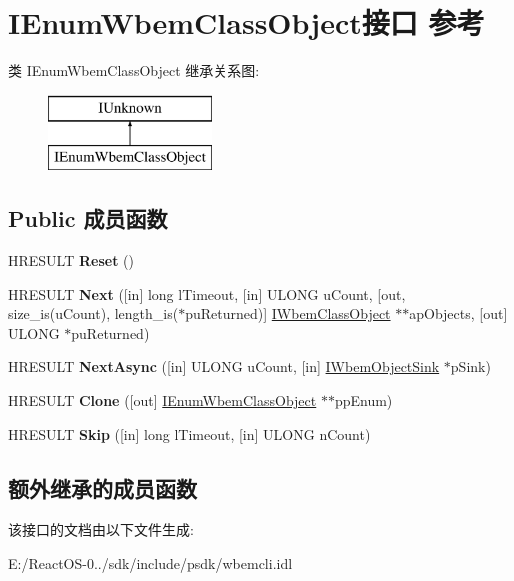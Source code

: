 \hypertarget{interface_i_enum_wbem_class_object}{}\section{I\+Enum\+Wbem\+Class\+Object接口 参考}
\label{interface_i_enum_wbem_class_object}
类 I\+Enum\+Wbem\+Class\+Object 继承关系图\+:\begin{figure}[H]
\begin{center}
\leavevmode
\includegraphics[height=2.000000cm]{interface_i_enum_wbem_class_object}
\end{center}
\end{figure}
\subsection*{Public 成员函数}
\begin{DoxyCompactItemize}
\item 
\mbox{\label{interface_i_enum_wbem_class_object_a07b5b424fe76a86534e214233ad41e21}} 
H\+R\+E\+S\+U\+LT {\bfseries Reset} ()
\item 
\mbox{\label{interface_i_enum_wbem_class_object_a146b51addd231b115fd0f9b2d6c6fa98}} 
H\+R\+E\+S\+U\+LT {\bfseries Next} (\mbox{[}in\mbox{]} long l\+Timeout, \mbox{[}in\mbox{]} U\+L\+O\+NG u\+Count, \mbox{[}out, size\+\_\+is(u\+Count), length\+\_\+is($\ast$pu\+Returned)\mbox{]} \hyperlink{interface_i_wbem_class_object}{I\+Wbem\+Class\+Object} $\ast$$\ast$ap\+Objects, \mbox{[}out\mbox{]} U\+L\+O\+NG $\ast$pu\+Returned)
\item 
\mbox{\label{interface_i_enum_wbem_class_object_a4f1ead1f8b7188451dbd199c3e5cbec9}} 
H\+R\+E\+S\+U\+LT {\bfseries Next\+Async} (\mbox{[}in\mbox{]} U\+L\+O\+NG u\+Count, \mbox{[}in\mbox{]} \hyperlink{interface_i_wbem_object_sink}{I\+Wbem\+Object\+Sink} $\ast$p\+Sink)
\item 
\mbox{\label{interface_i_enum_wbem_class_object_ae5aae596e8d06a4a8c0ecdb8fc948c09}} 
H\+R\+E\+S\+U\+LT {\bfseries Clone} (\mbox{[}out\mbox{]} \hyperlink{interface_i_enum_wbem_class_object}{I\+Enum\+Wbem\+Class\+Object} $\ast$$\ast$pp\+Enum)
\item 
\mbox{\label{interface_i_enum_wbem_class_object_a58eda456bcad57f2dda4e678d25d471a}} 
H\+R\+E\+S\+U\+LT {\bfseries Skip} (\mbox{[}in\mbox{]} long l\+Timeout, \mbox{[}in\mbox{]} U\+L\+O\+NG n\+Count)
\end{DoxyCompactItemize}
\subsection*{额外继承的成员函数}


该接口的文档由以下文件生成\+:\begin{DoxyCompactItemize}
\item 
E\+:/\+React\+O\+S-\/0../sdk/include/psdk/wbemcli.\+idl\end{DoxyCompactItemize}
